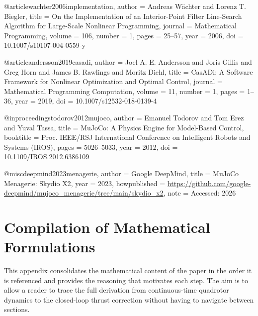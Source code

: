 \documentclass[conference]{IEEEtran}
\begin{document}
@article{wachter2006implementation,
  author    = {Andreas W{\"a}chter and Lorenz T. Biegler},
  title     = {On the Implementation of an Interior-Point Filter Line-Search Algorithm for Large-Scale Nonlinear Programming},
  journal   = {Mathematical Programming},
  volume    = {106},
  number    = {1},
  pages     = {25--57},
  year      = {2006},
  doi       = {10.1007/s10107-004-0559-y}
}

@article{andersson2019casadi,
  author    = {Joel A. E. Andersson and Joris Gillis and Greg Horn and James B. Rawlings and Moritz Diehl},
  title     = {{CasADi}: A Software Framework for Nonlinear Optimization and Optimal Control},
  journal   = {Mathematical Programming Computation},
  volume    = {11},
  number    = {1},
  pages     = {1--36},
  year      = {2019},
  doi       = {10.1007/s12532-018-0139-4}
}

@inproceedings{todorov2012mujoco,
  author    = {Emanuel Todorov and Tom Erez and Yuval Tassa},
  title     = {{MuJoCo}: A Physics Engine for Model-Based Control},
  booktitle = {Proc. IEEE/RSJ International Conference on Intelligent Robots and Systems (IROS)},
  pages     = {5026--5033},
  year      = {2012},
  doi       = {10.1109/IROS.2012.6386109}
}

@misc{deepmind2023menagerie,
  author    = {{Google DeepMind}},
  title     = {{MuJoCo} Menagerie: Skydio {X2}},
  year      = {2023},
  howpublished = {\url{https://github.com/google-deepmind/mujoco_menagerie/tree/main/skydio_x2}},
  note      = {Accessed: 2026}
}





\appendices

\section{Compilation of Mathematical Formulations}
This appendix consolidates the mathematical content of the paper in the order it is referenced and provides the reasoning that motivates each step. The aim is to allow a reader to trace the full derivation from continuous-time quadrotor dynamics to the closed-loop thrust correction without having to navigate between sections.
\end{document}
